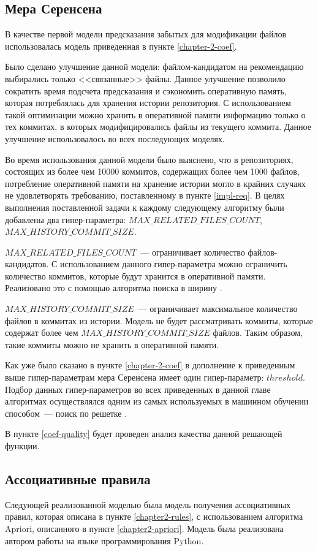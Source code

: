     \subsection{Мера Серенсена}\label{chapter3-coef}
В качестве первой модели предсказания забытых для модификации файлов использовалась модель приведенная в пункте \ref{chapter-2-coef}. 

Было сделано улучшение данной модели: файлом-кандидатом на рекомендацию выбирались только <<связанные>> файлы. Данное улучшение позволило сократить время подсчета предсказания и сэкономить оперативную память, которая потреблялась для хранения истории репозитория. С использованием такой оптимизации можно хранить в оперативной памяти информацию только о тех коммитах, в которых модифицировались файлы из текущего коммита. Данное улучшение использовалось во всех последующих моделях.

Во время использования данной модели было выяснено, что в репозиториях, состоящих из более чем 10000 коммитов, содержащих более чем 1000 файлов, потребление оперативной памяти на хранение истории могло в крайних случаях не удовлетворять требованию, поставленному в пункте \ref{impl-req}. В целях выполнения поставленной задачи к каждому следующему алгоритму были добавлены два гипер-параметра: $MAX\_RELATED\_FILES\_COUNT$, $MAX\_HISTORY\_COMMIT\_SIZE$. 

$MAX\_RELATED\_FILES\_COUNT$~--- ограничивает количество файлов-кандидатов. С использованием данного гипер-параметра можно ограничить количество коммитов, которые будут хранится в оперативной памяти. Реализовано это с помощью алгоритма поиска в ширину \cite{alghorithms}.

$MAX\_HISTORY\_COMMIT\_SIZE$~--- ограничивает максимальное количество файлов в коммитах из истории. Модель не будет рассматривать коммиты, которые содержат более чем $MAX\_HISTORY\_COMMIT\_SIZE$ файлов. Таким образом, такие коммиты можно не хранить в оперативной памяти.

Как уже было сказано в пункте \ref{chapter-2-coef} в дополнение к приведенным выше гипер-параметрам мера Серенсена имеет один гипер-параметр: $threshold$. Подбор данных гипер-параметров во всех приведенных в данной главе алгоритмах осуществлялся одним из самых используемых в машинном обучении способом~--- поиск по решетке \cite{claesen2015hyperparameter}.

В пункте \ref{coef-quality} будет проведен анализ качества данной решающей функции.
    \subsection{Ассоциативные правила}
Следующей реализованной моделью была модель получения ассоциативных правил, которая описана в пункте \ref{chapter2-rules}, с использованием алгоритма Apriori, описанного в пункте \ref{chapter2-apriori}. Модель была реализована автором работы на языке программирования Python.

